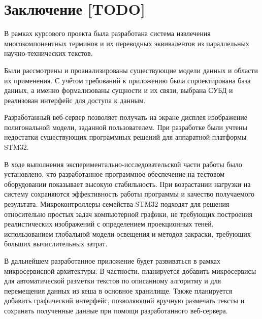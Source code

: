 \section*{Заключение [TODO]}

В рамках курсового проекта была разработана система извлечения многокомпонентных терминов и их переводных эквивалентов из параллельных научно-технических текстов.

Были рассмотрены и проанализированы существующие модели данных и области их применения. %
С учётом требований к приложению была спроектирована база данных, а именно формализованы сущности и их связи, выбрана СУБД и реализован интерфейс для доступа к данным.

Разработанный веб-сервер позволяет получать на экране дисплея изображение полигональной модели, заданной пользователем. При разработке были учтены недостатки существующих программных решений для аппаратной платформы STM32.

В ходе выполнения экспериментально-исследовательской части работы было установлено, что разработанное программное обеспечение на тестовом оборудовании показывает высокую стабильность. При возрастании нагрузки на систему сохраняются эффективность работы программы и качество получаемого результата. Микроконтроллеры семейства STM32 подходят для решения относительно простых задач компьютерной графики, не требующих построения реалистических изображений с определением проекционных теней, использованием глобальной модели освещения и методов закраски, требующих больших вычислительных затрат.


В дальнейшем разработанное приложение будет развиваться в рамках микросервисной архитектуры. В частности, планируется добавить микросервисы для автоматической разметки текстов по описанному алгоритму и для перемещения данных из кеша в основное хранилище. Также планируется добавить графический интерфейс, позволяющий вручную размечать тексты и сохранять полученные данные при помощи разработанного веб-сервера.

